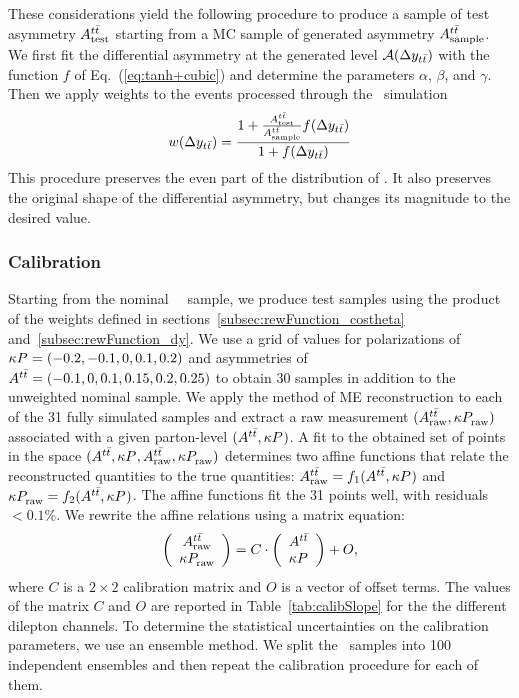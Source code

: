 \documentclass[aps,prd,twocolumn,showpacs,superscriptaddress,groupedaddress,floatfix]{revtex4}
\begin{document}
These considerations yield the following procedure to produce a sample
of test asymmetry $A^{t\bar t}_{\rm test}$ starting from a MC sample
of generated asymmetry  $A^{t\bar t}_{\rm sample}$.
We first fit the  differential asymmetry at the generated level
${\cal A}(\Delta y_{t\bar{t}})$ with the function $f$ of Eq.~(\ref{eq:tanh+cubic}) and determine
the parameters $\alpha$, $\beta$, and $\gamma$. Then we
apply weights to the events processed through  the \dzero\ simulation
\begin{align} \label{eq:reweighting_dy}
w(\Delta y_{t\bar{t}})= \frac
{  1+ \frac  {A^{t\bar t}_{\rm test}}{A^{t\bar t}_{\rm sample}} f(\Delta y_{t\bar{t}})}
{ 1+  f(\Delta y_{t\bar{t}})}
\end{align}
This procedure preserves
the even part of the distribution of \dyttbar.
It also preserves  the original shape of the differential asymmetry, but changes its magnitude to the desired value.





\subsubsection{Calibration}
\label{sec:calib_result}
Starting from the nominal \mcatnlo\ \ttbar\ sample,
we produce  test samples using  the product of the weights
defined in sections~\ref{subsec:rewFunction_costheta} and~\ref{subsec:rewFunction_dy}.
We use a grid of values for polarizations of $\kappa P^{}_{}=(-0.2,-0.1,0,0.1,0.2)$
and asymmetries of $A^{t\bar t}=(-0.1,0,0.1,0.15,0.2,0.25)$ to obtain
30 samples
in addition to the unweighted nominal sample.
We apply  the
method of ME reconstruction 
to each of the 31 fully simulated samples and extract
a raw measurement  $(A^{t\bar t}_{\rm raw},\kappa P^{}_{ \rm raw})$ associated with a given  parton-level  $(A^{t\bar t},\kappa P^{}_{})$.
A fit to the obtained set of points in the space $(A^{t\bar t},\kappa P^{}_{},A^{t\bar t}_{\rm raw},\kappa P^{}_{ \rm raw})$ determines two affine functions that relate the
reconstructed quantities to the true quantities: $A^{t\bar t}_{\rm raw}=f_1(A^{t\bar t},\kappa P^{}_{})$ and $\kappa P^{}_{ \rm raw}=f_2(A^{t\bar t},\kappa P^{}_{})$.
The affine functions fit  the 31 points well, with residuals $<0.1\%$.
We rewrite the affine relations using a matrix equation:
\begin{equation}\label{eq:Matrix_calibration}
{\left(\begin{array}{c} \ensuremath{A^{t\bar t}_{\rm raw}}\\ {\ensuremath{\kappa P^{}_{ \rm raw}}} \end{array}\right)}= C\cdot {\left(\begin{array}{c} \ensuremath{A^{t\bar t}}\\ {\ensuremath{\kappa P^{}_{}}} \end{array}\right)} + O,
\end{equation}
where $C$ is a  $2\times2$   calibration matrix and $O$ is a vector of offset terms. The values of the matrix $C$ and $O$ are reported in Table~\ref{tab:calibSlope} for the  the different dilepton channels.
To determine the statistical uncertainties on
the calibration parameters,
we use an ensemble method. We split  the \mcatnlo\ samples into 100 independent ensembles and then repeat the calibration procedure for each of them.
\end{document}
